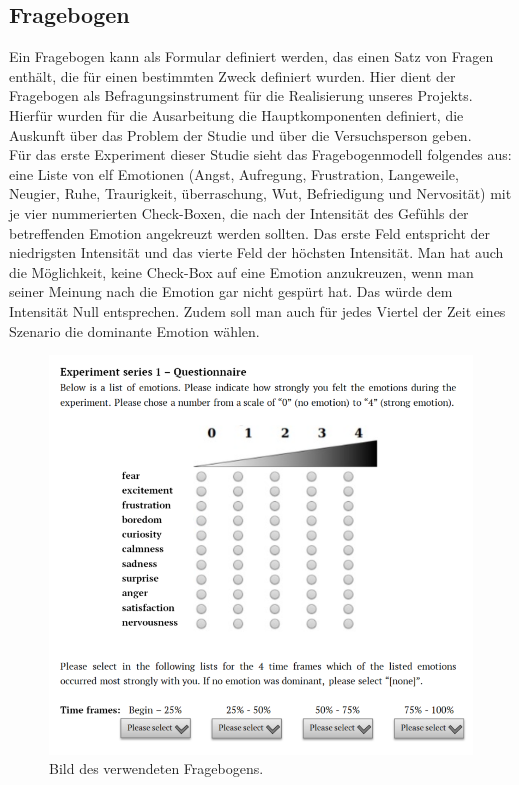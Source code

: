 \subsection{Fragebogen} \label{fragebogen-1}


Ein Fragebogen kann als Formular definiert werden, das einen Satz von Fragen enth{\"a}lt, die f{\"u}r einen bestimmten Zweck definiert wurden\cite{gault-questionnaire}.
Hier dient der Fragebogen als Befragungsinstrument f{\"u}r die Realisierung unseres Projekts. 
Hierf{\"u}r wurden f{\"u}­r die Ausarbeitung die Hauptkomponenten definiert, die Auskunft {\"u}ber das Problem der Studie und {\"u}ber die Versuchsperson geben. \\

F{\"u}r das erste Experiment dieser Studie sieht das Fragebogenmodell folgendes aus: eine Liste von elf Emotionen (Angst, Aufregung, Frustration, Langeweile, Neugier, Ruhe, Traurigkeit, {\"u}berraschung, Wut, Befriedigung und Nervosit{\"a}t) mit je vier nummerierten  Check-Boxen, die nach der Intensit{\"a}t des Gef{\"u}hls der betreffenden Emotion angekreuzt werden sollten. 
Das erste Feld entspricht der niedrigsten Intensit{\"a}t und das vierte Feld der h{\"o}chsten Intensit{\"a}t. Man hat auch die M{\"o}glichkeit, keine Check-Box auf eine Emotion anzukreuzen, wenn man seiner Meinung nach die Emotion gar nicht gesp{\"u}rt hat. 
Das w{\"u}rde dem Intensit{\"a}t Null entsprechen. 
Zudem soll man auch f{\"u}r jedes Viertel der Zeit eines Szenario die dominante Emotion w{\"a}hlen. \\


\begin{figure}[H] \centering
\includegraphics[width=\textwidth]{Images/questionnaire-1.png} 
\vspace{-0.3cm} 
\caption{Bild des verwendeten Fragebogens.}
\label{fig-questionare-1} 
\end{figure}

